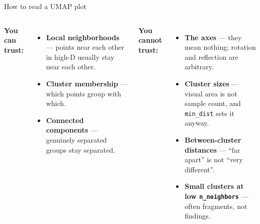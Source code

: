 \documentclass[aspectratio=169]{beamer}
\begin{document}
\begin{frame}{How to read a UMAP plot}
  \begin{columns}[T]
    \textbf{You can trust:}
    \begin{itemize}\small
      \item \textcolor{paramgreen}{\textbf{Local neighborhoods}} --- points near each other in
        high-D usually stay near each other.
      \item \textcolor{paramgreen}{\textbf{Cluster membership}} --- which points group with which.
      \item \textcolor{paramgreen}{\textbf{Connected components}} --- genuinely separated groups
        stay separated.
    \end{itemize}
    \textbf{You cannot trust:}
    \begin{itemize}\small
      \item \textcolor{armred}{\textbf{The axes}} --- they mean nothing; rotation and reflection
        are arbitrary.
      \item \textcolor{armred}{\textbf{Cluster sizes}} --- visual area is not sample count, and
        \texttt{min\_dist} sets it anyway.
      \item \textcolor{armred}{\textbf{Between-cluster distances}} --- ``far apart'' is not ``very
        different''.
      \item \textcolor{armred}{\textbf{Small clusters at low \texttt{n\_neighbors}}} --- often
        fragments, not findings.
    \end{itemize}
  \end{columns}
  \vfill
\end{frame}
\end{document}
